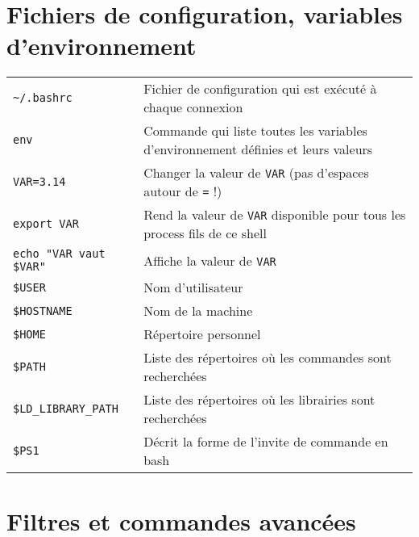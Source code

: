 \documentclass [a4paper]{article}
\begin{document}
\section*{Fichiers de configuration, variables d'environnement}

\begin{tabular}{ll}
\hline
{\verb+~/.bashrc+}                              & Fichier de configuration qui est exécuté à chaque connexion\\
{\verb+env+}                                    & Commande qui liste toutes les variables d'environnement définies et leurs valeurs\\
{\verb+VAR=3.14+}                               & Changer la valeur de \verb+VAR+ (pas d'espaces autour de \verb+=+ !)\\
{\verb+export VAR+}                             & Rend la valeur de \verb+VAR+ disponible pour tous les process fils de ce shell\\
{\verb+echo "VAR vaut $VAR"+}                   & Affiche la valeur de \verb+VAR+\\
{\verb+$USER+}                                   & Nom d'utilisateur\\
{\verb+$HOSTNAME+}                               & Nom de la machine\\
{\verb+$HOME+}                                   & Répertoire personnel\\
{\verb+$PATH+}                                   & Liste des répertoires où les commandes sont recherchées\\
{\verb+$LD_LIBRARY_PATH+}                        & Liste des répertoires où les librairies sont recherchées\\
{\verb+$PS1+}                                    & Décrit la forme de l'invite de commande en bash\\

\hline
\end{tabular}

\section*{Filtres et commandes avancées}
\end{document}
